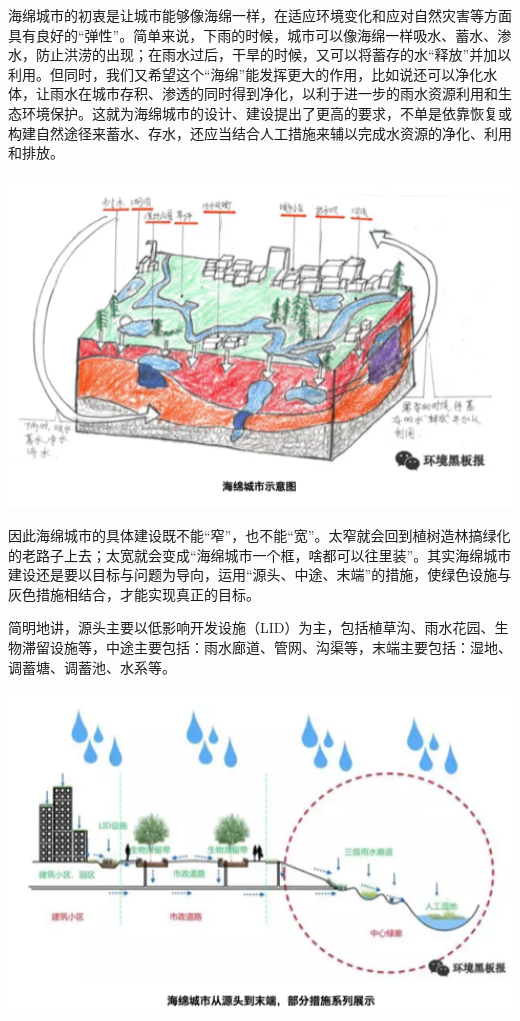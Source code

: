 \documentclass[]{book}
\begin{document}
海绵城市的初衷是让城市能够像海绵一样，在适应环境变化和应对自然灾害等方面具有良好的``弹性''。简单来说，下雨的时候，城市可以像海绵一样吸水、蓄水、渗水，防止洪涝的出现；在雨水过后，干旱的时候，又可以将蓄存的水``释放''并加以利用。但同时，我们又希望这个``海绵''能发挥更大的作用，比如说还可以净化水体，让雨水在城市存积、渗透的同时得到净化，以利于进一步的雨水资源利用和生态环境保护。这就为海绵城市的设计、建设提出了更高的要求，不单是依靠恢复或构建自然途径来蓄水、存水，还应当结合人工措施来辅以完成水资源的净化、利用和排放。

\includegraphics[width=6.67in]{images/ch3}

因此海绵城市的具体建设既不能``窄''，也不能``宽''。太窄就会回到植树造林搞绿化的老路子上去；太宽就会变成``海绵城市一个框，啥都可以往里装''。其实海绵城市建设还是要以目标与问题为导向，运用``源头、中途、末端''的措施，使绿色设施与灰色措施相结合，才能实现真正的目标。

简明地讲，源头主要以低影响开发设施（LID）为主，包括植草沟、雨水花园、生物滞留设施等，中途主要包括：雨水廊道、管网、沟渠等，末端主要包括：湿地、调蓄塘、调蓄池、水系等。

\includegraphics[width=6.67in]{images/ch4}
\end{document}
